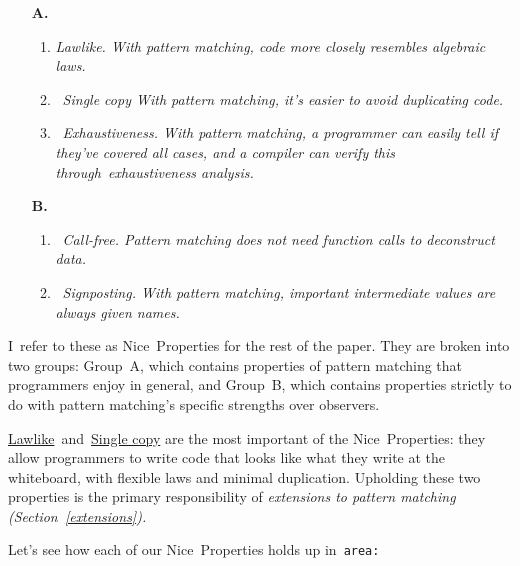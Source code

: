 \documentclass[manuscript,screen 12pt, nonacm]{acmart}
\begin{document}
    \begin{enumerate}
      \item [\textbf{A.}]
      \begin{enumerate}[label=\arabic*]
        \item  \it{Lawlike.} With pattern matching, code more closely
        resembles algebraic laws. 
        \label{p1}
        \item~\it{Single copy} With pattern matching, it's easier to avoid
        duplicating code.
        \label{p2}
        \item~\it{Exhaustiveness.} With pattern matching, a programmer can
        easily tell if they've covered all cases, and a compiler can verify this
        through~\it{exhaustiveness analysis}.
        \label{p5}
    \end{enumerate}

    \item [\textbf{B.}]
    \begin{enumerate}[start=4, label=\arabic*]
      \item~\it{Call-free.} Pattern matching does not need function
      calls to deconstruct data.~\nolinebreak
      \label{p3}
      \item~\it{Signposting.} With pattern matching, important
      intermediate values are always given names. 
      \nolinebreak
      \label{p4}
    \end{enumerate}
  \end{enumerate}

    I~refer to these as Nice~Properties for the rest of the paper. They are broken
    into two groups: Group~A, which contains properties of pattern matching that
    programmers enjoy in general, and Group~B,  which contains properties strictly
    to do with pattern matching's specific strengths over observers. 

    \hyperref[p1]{Lawlike}~and~\hyperref[p2]{Single copy} are the most important
    of the Nice~Properties: they allow programmers to write code that looks like
    what they write at the whiteboard, with flexible laws and minimal
    duplication. Upholding these two properties is the primary responsibility of
    \it{extensions} to pattern matching (Section~\ref{extensions}). 
    
    Let's see how each of our Nice~Properties holds up in~\tt{area}: 
    
\end{document}
